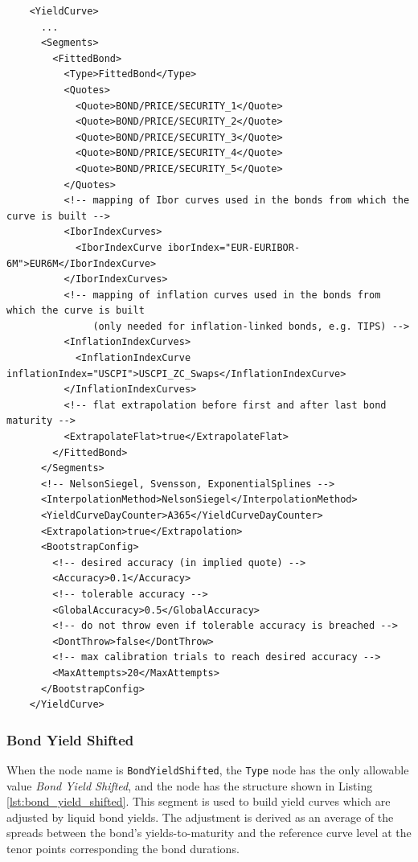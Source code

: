 \begin{listing}[H]
\begin{verbatim}
    <YieldCurve>
      ...
      <Segments>
        <FittedBond>
          <Type>FittedBond</Type>
          <Quotes>
            <Quote>BOND/PRICE/SECURITY_1</Quote>
            <Quote>BOND/PRICE/SECURITY_2</Quote>
            <Quote>BOND/PRICE/SECURITY_3</Quote>
            <Quote>BOND/PRICE/SECURITY_4</Quote>
            <Quote>BOND/PRICE/SECURITY_5</Quote>
          </Quotes>
          <!-- mapping of Ibor curves used in the bonds from which the curve is built -->
          <IborIndexCurves>
            <IborIndexCurve iborIndex="EUR-EURIBOR-6M">EUR6M</IborIndexCurve>
          </IborIndexCurves>
          <!-- mapping of inflation curves used in the bonds from which the curve is built
               (only needed for inflation-linked bonds, e.g. TIPS) -->
          <InflationIndexCurves>
            <InflationIndexCurve inflationIndex="USCPI">USCPI_ZC_Swaps</InflationIndexCurve>
          </InflationIndexCurves>
          <!-- flat extrapolation before first and after last bond maturity -->
          <ExtrapolateFlat>true</ExtrapolateFlat>
        </FittedBond>
      </Segments>
      <!-- NelsonSiegel, Svensson, ExponentialSplines -->
      <InterpolationMethod>NelsonSiegel</InterpolationMethod>
      <YieldCurveDayCounter>A365</YieldCurveDayCounter>
      <Extrapolation>true</Extrapolation>
      <BootstrapConfig>
        <!-- desired accuracy (in implied quote) -->
        <Accuracy>0.1</Accuracy>
        <!-- tolerable accuracy -->
        <GlobalAccuracy>0.5</GlobalAccuracy>
        <!-- do not throw even if tolerable accuracy is breached -->
        <DontThrow>false</DontThrow>
        <!-- max calibration trials to reach desired accuracy -->
        <MaxAttempts>20</MaxAttempts>
      </BootstrapConfig>
    </YieldCurve>
\end{verbatim}
\caption{Fitted bond yield curve segment}
\label{lst:fitted_bond_segment}
\end{listing}

\subsubsection*{Bond Yield Shifted}
\label{sec:bond_yield_shifted}

When the node name is \lstinline!BondYieldShifted!, the \lstinline!Type! node has the only allowable value \emph{Bond Yield Shifted},
and the node has the structure shown in Listing \ref{lst:bond_yield_shifted}. This segment is used to build yield
curves which are adjusted by liquid bond yields. The adjustment is derived as an average of the spreads between the bond's
yields-to-maturity and the reference curve level at the tenor points corresponding the bond durations.

